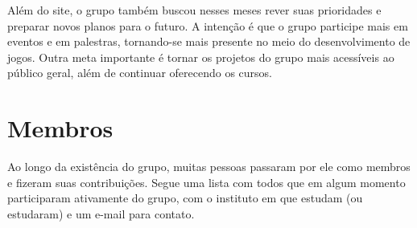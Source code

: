 \documentclass[12pt,onecolumn,a4paper]{article}
\begin{document}
        Além do site, o grupo também buscou nesses meses rever suas prioridades e preparar novos
        planos para o futuro. A intenção é que o grupo participe mais em eventos e em palestras,
        tornando-se mais presente no meio do desenvolvimento de jogos. Outra meta importante é
        tornar os projetos do grupo mais acessíveis ao público geral, além de continuar oferecendo
        os cursos.

\section{\LARGE Membros}
    Ao longo da existência do grupo, muitas pessoas passaram por ele como membros e fizeram suas
    contribuições. Segue uma lista com todos que em algum momento participaram ativamente do grupo,
    com o instituto em que estudam (ou estudaram) e um e-mail para contato.
    
\end{document}

